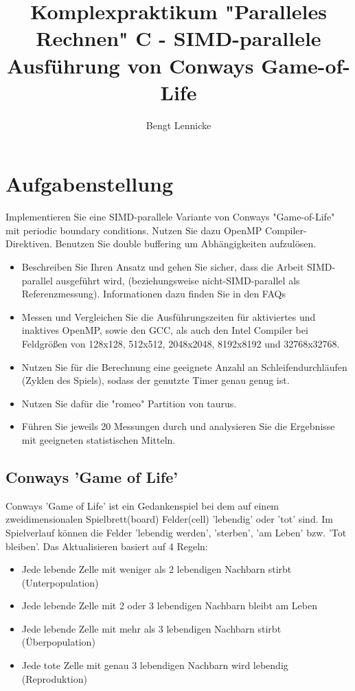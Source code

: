\documentclass[plainarticle,zihtitle,german,final,hyperref,utf8]{zihpub}
\author{Bengt Lennicke}
\title{Komplexpraktikum "Paralleles Rechnen" \newline C - SIMD-parallele Ausführung von Conways Game-of-Life}
\begin{document}
\section{Aufgabenstellung}
Implementieren Sie eine SIMD-parallele Variante von Conways "Game-of-Life" mit periodic boundary conditions. Nutzen Sie dazu OpenMP Compiler-Direktiven. Benutzen Sie double buffering um Abhängigkeiten aufzulösen.

\begin{itemize}
\item Beschreiben Sie Ihren Ansatz und gehen Sie sicher, dass die Arbeit SIMD-parallel ausgeführt wird, (beziehungsweise nicht-SIMD-parallel als Referenzmessung). Informationen dazu finden Sie in den FAQs
\item Messen und Vergleichen Sie die Ausführungszeiten für aktiviertes und inaktives OpenMP, sowie den GCC, als auch den Intel Compiler bei Feldgrößen von 128x128, 512x512, 2048x2048, 8192x8192 und 32768x32768.
\item Nutzen Sie für die Berechnung eine geeignete Anzahl an Schleifendurchläufen (Zyklen des Spiels), sodass der genutzte Timer genau genug ist.
\item Nutzen Sie dafür die "romeo" Partition von taurus.
\item Führen Sie jeweils 20 Messungen durch und analysieren Sie die Ergebnisse mit geeigneten statistischen Mitteln.
\end{itemize}

\subsection{Conways 'Game of Life'}
Conways 'Game of Life' ist ein Gedankenspiel bei dem auf einem zweidimensionalen Spielbrett(board) Felder(cell) 'lebendig' oder 'tot' sind. Im Spielverlauf können die Felder 'lebendig werden', 'sterben', 'am Leben' bzw. 'Tot bleiben'. Das Aktualisieren basiert auf 4 Regeln:\cite{conwaysgame_wiki}
 
\begin{itemize}
	\item Jede lebende Zelle mit weniger als 2 lebendigen Nachbarn stirbt (Unterpopulation)
 	\item Jede lebende Zelle mit 2 oder 3 lebendigen Nachbarn bleibt am Leben
 	\item Jede lebende Zelle mit mehr als 3 lebendigen Nachbarn stirbt (Überpopulation)
 	\item Jede tote Zelle mit genau 3 lebendigen Nachbarn wird lebendig (Reproduktion)
\end{itemize}
\end{document}

